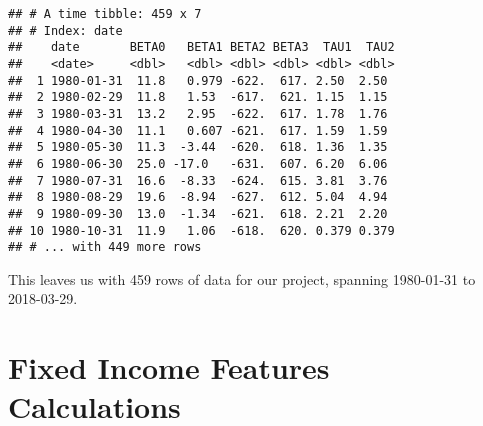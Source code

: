 \documentclass[]{book}
\newenvironment{Shaded}{\begin{snugshade}}{\end{snugshade}}
\newcommand{\DataTypeTok}[1]{\textcolor[rgb]{0.13,0.29,0.53}{#1}}
\newcommand{\KeywordTok}[1]{\textcolor[rgb]{0.13,0.29,0.53}{\textbf{#1}}}
\newcommand{\NormalTok}[1]{#1}
\newcommand{\OperatorTok}[1]{\textcolor[rgb]{0.81,0.36,0.00}{\textbf{#1}}}
\newcommand{\StringTok}[1]{\textcolor[rgb]{0.31,0.60,0.02}{#1}}
\begin{document}
\begin{Shaded}
\end{Shaded}

\begin{verbatim}
## # A time tibble: 459 x 7
## # Index: date
##    date       BETA0   BETA1 BETA2 BETA3  TAU1  TAU2
##    <date>     <dbl>   <dbl> <dbl> <dbl> <dbl> <dbl>
##  1 1980-01-31  11.8   0.979 -622.  617. 2.50  2.50 
##  2 1980-02-29  11.8   1.53  -617.  621. 1.15  1.15 
##  3 1980-03-31  13.2   2.95  -622.  617. 1.78  1.76 
##  4 1980-04-30  11.1   0.607 -621.  617. 1.59  1.59 
##  5 1980-05-30  11.3  -3.44  -620.  618. 1.36  1.35 
##  6 1980-06-30  25.0 -17.0   -631.  607. 6.20  6.06 
##  7 1980-07-31  16.6  -8.33  -624.  615. 3.81  3.76 
##  8 1980-08-29  19.6  -8.94  -627.  612. 5.04  4.94 
##  9 1980-09-30  13.0  -1.34  -621.  618. 2.21  2.20 
## 10 1980-10-31  11.9   1.06  -618.  620. 0.379 0.379
## # ... with 449 more rows
\end{verbatim}

This leaves us with 459 rows of data for our project, spanning
1980-01-31 to 2018-03-29.

\hypertarget{rates}{%
\chapter{Fixed Income Features Calculations}\label{rates}}


\end{document}
